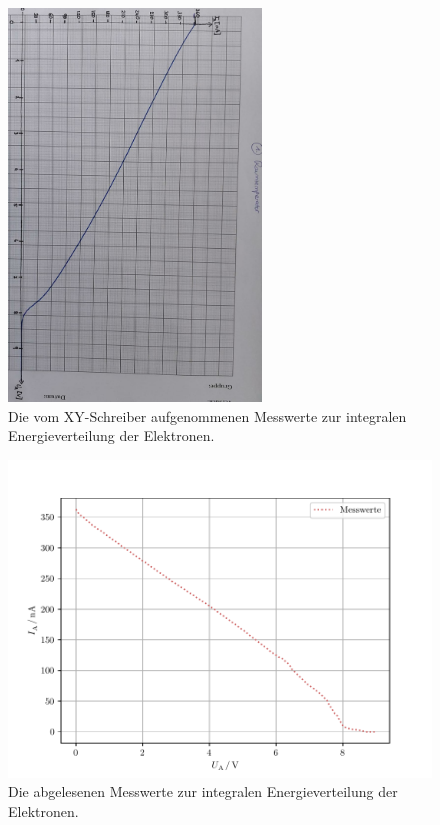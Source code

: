 \begin{figure}
    \centering
    \includegraphics[width=0.6\textwidth,angle=90]{plots/Plot12.jpeg}
    \caption{Die vom XY-Schreiber aufgenommenen Messwerte zur integralen Energieverteilung der Elektronen.}
    \label{fig:EnergieMessFoto}
\end{figure}
\begin{figure}
    \centering
    \includegraphics[width=\textwidth]{plots/Energie2.pdf}
    \caption{Die abgelesenen Messwerte zur integralen Energieverteilung der Elektronen.}
    \label{fig:EnergieMessAb}
\end{figure}

